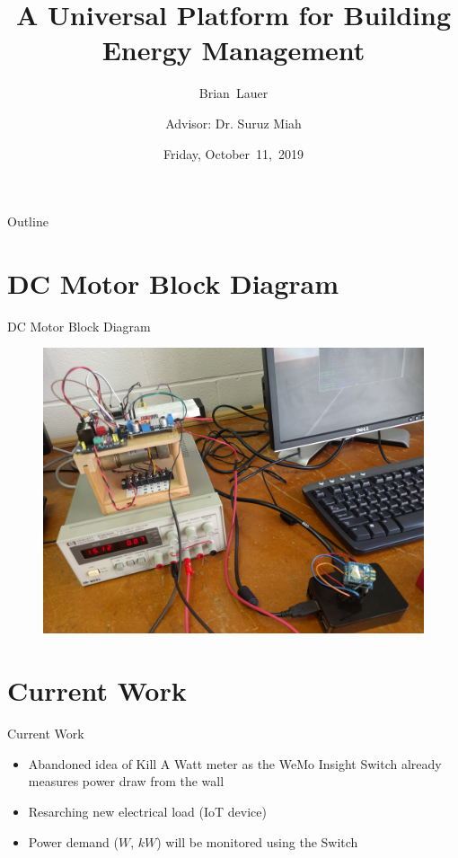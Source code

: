 \documentclass{beamer}
\title[Progress]{A Universal Platform for Building Energy Management}
\author[B.~Lauer]{Brian~Lauer\\\and
Advisor: Dr. Suruz Miah}
\institute[Bradley University] %
{
  Department of Electrical and Computer Engineering\\
  Bradley University\\
  1501 W. Bradley Avenue\\
  Peoria, IL, 61625, USA
}
\date[October~11,~2019]{Friday, October~11,~2019}
\begin{document}
\begin{frame}
  \titlepage
\end{frame}

\begin{frame}{Outline}
  \tableofcontents
\end{frame}
%
\section{DC Motor Block Diagram}
\begin{frame}{DC Motor Block Diagram}
\begin{figure}
\centering
\includegraphics[scale=0.65]{figs/motorSetup}
\end{figure}
\end{frame}
%
\section{Current Work}
\begin{frame}{Current Work}
\begin{itemize}
\item Abandoned idea of Kill A Watt meter as the WeMo Insight Switch already measures power draw from the wall
\item Resarching new electrical load (IoT device)
\item Power demand ($W$, $kW$) will be monitored using the Switch
\end{itemize}
\end{frame}
%
\end{document}
